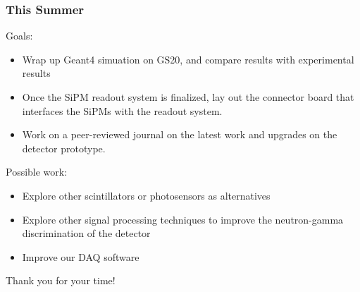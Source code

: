 \documentclass[xcolor=x11names, compress, handout]{beamer}
\renewcommand{\(}{\begin{columns}}
\renewcommand{\)}{\end{columns}}
\newcommand{\<}[1]{\begin{column}{#1}}
\renewcommand{\>}{\end{column}}
\begin{document}
\begin{frame}[c]
\frametitle{This Summer}
Goals:
  \begin{itemize}
    \item Wrap up Geant4 simuation on GS20, and compare results with experimental results
    \item Once the SiPM readout system is finalized, lay out the connector board that interfaces the SiPMs with the readout system.
    \item Work on a peer-reviewed journal on the latest work and upgrades on the detector prototype.
  \end{itemize}

Possible work:
  \begin{itemize}
    \item Explore other scintillators or photosensors as alternatives
    \item Explore other signal processing techniques to improve the neutron-gamma discrimination of the detector
    \item Improve our DAQ software 
  \end{itemize}
\end{frame}

% 



\begin{frame}
  \vspace{3cm}
  \centering
  Thank you for your time!
  \vspace{3cm}
\end{frame}
\end{document}
